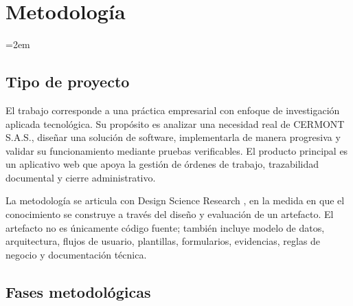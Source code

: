 
\chapter{Metodología}
\label{ch:metodologia}

\setlength{\parindent}{0pt}
\setlength{\parskip}{6pt}
\sloppy
\emergencystretch=2em
\raggedbottom
\section{Tipo de proyecto}

El trabajo corresponde a una práctica empresarial con enfoque de investigación aplicada tecnológica. Su propósito es analizar una necesidad real de CERMONT S.A.S., diseñar una solución de software, implementarla de manera progresiva y validar su funcionamiento mediante pruebas verificables. El producto principal es un aplicativo web que apoya la gestión de órdenes de trabajo, trazabilidad documental y cierre administrativo.

La metodología se articula con Design Science Research \cite{hevner2004,peffers2007}, en la medida en que el conocimiento se construye a través del diseño y evaluación de un artefacto. El artefacto no es únicamente código fuente; también incluye modelo de datos, arquitectura, flujos de usuario, plantillas, formularios, evidencias, reglas de negocio y documentación técnica.

\section{Fases metodológicas}

